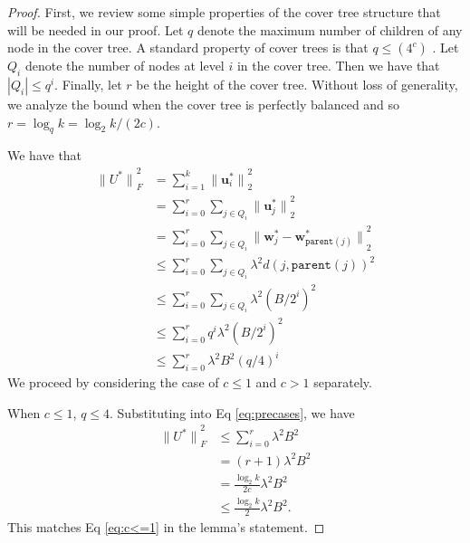\documentclass[twoside]{article}
\newcommand{\parent}[1]{\texttt{parent}({#1})}
\renewcommand{\star}[1]{{#1}^{*}}
\newcommand{\uu}{\mathbf u}
\newcommand{\w}{\mathbf w}
\newcommand{\ltwo}[1]{{\lVert {#1} \rVert}_2}
\newcommand{\lF}[1]{{\lVert {#1} \rVert}_F}
\begin{document}
\begin{proof}
    First, we review some simple properties of the cover tree structure that will be needed in our proof.
    Let $q$ denote the maximum number of children of any node in the cover tree.
    A standard property of cover trees is that $q \le (4^c)$ \citep[Lemma 25]{izbickithesis}.
    Let $Q_i$ denote the number of nodes at level $i$ in the cover tree.
    Then we have that $|Q_i| \le q^i.$
    Finally, let $r$ be the height of the cover tree.
    Without loss of generality, we analyze the bound when the cover tree is perfectly balanced and so $r = \log_q k = \log_2 k / (2c)$.

We have that
\begin{align}
    \lF{\star U}^2
    &= \sum_{i=1}^k \ltwo{\star\uu_i}^2 \\
    &= \sum_{i=0}^r \sum_{j\in Q_i} \ltwo{\star\uu_j}^2 \\
    &= \sum_{i=0}^r \sum_{j\in Q_i} \ltwo{\star\w_j - \star\w_{\parent{j}}}^2 \\
    &\le \sum_{i=0}^r \sum_{j\in Q_i} \lambda^2 d(j, \parent{j})^2 \\
    &\le \sum_{i=0}^r \sum_{j\in Q_i} \lambda^2 (B/2^i)^2 \\
    &\le \sum_{i=0}^r q^i \lambda^2 (B/2^i)^2 \\
    &\le \sum_{i=0}^r \lambda^2 B^2 (q/4)^i 
    \label{eq:precases}
\end{align}
We proceed by considering the case of $c\le1$ and $c>1$ separately.

When $c\le1$, $q\le4$.
Substituting into Eq \eqref{eq:precases}, we have
\begin{align}
    \lF{\star U}^2
    &\le \sum_{i=0}^r \lambda^2 B^2 \\
    &= (r+1) \lambda^2 B^2 \\
    &= \frac{\log_2k}{2c} \lambda^2 B^2 \\
    &\le \frac{\log_2k}{2} \lambda^2 B^2
    .
\end{align}
This matches Eq \eqref{eq:c<=1} in the lemma's statement.


\end{proof}
\end{document}
